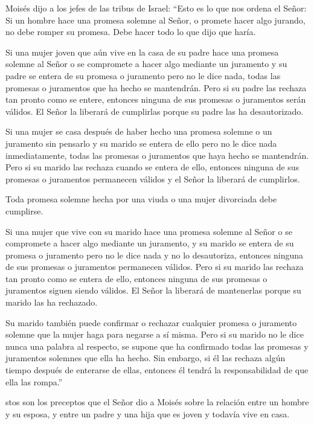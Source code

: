  Moisés dijo a los jefes de las tribus de Israel: ``Esto es
lo que nos ordena el Señor:  Si un hombre hace una promesa
solemne al Señor, o promete hacer algo jurando, no debe romper su
promesa. Debe hacer todo lo que dijo que haría.

 Si una mujer joven que aún vive en la casa de su padre hace
una promesa solemne al Señor o se compromete a hacer algo mediante un
juramento  y su padre se entera de su promesa o juramento
pero no le dice nada, todas las promesas o juramentos que ha hecho se
mantendrán.  Pero si su padre las rechaza tan pronto como se
entere, entonces ninguna de sus promesas o juramentos serán válidos. El
Señor la liberará de cumplirlas porque su padre las ha desautorizado.

 Si una mujer se casa después de haber hecho una promesa
solemne o un juramento sin pensarlo  y su marido se entera
de ello pero no le dice nada inmediatamente, todas las promesas o
juramentos que haya hecho se mantendrán.  Pero si su marido
las rechaza cuando se entera de ello, entonces ninguna de sus promesas o
juramentos permanecen válidos y el Señor la liberará de cumplirlos.

 Toda promesa solemne hecha por una viuda o una mujer
divorciada debe cumplirse.

 Si una mujer que vive con su marido hace una promesa
solemne al Señor o se compromete a hacer algo mediante un juramento,
 y su marido se entera de su promesa o juramento pero no le
dice nada y no lo desautoriza, entonces ninguna de sus promesas o
juramentos permanecen válidos.  Pero si su marido las
rechaza tan pronto como se entera de ello, entonces ninguna de sus
promesas o juramentos siguen siendo válidos. El Señor la liberará de
mantenerlas porque su marido las ha rechazado.

 Su marido también puede confirmar o rechazar cualquier
promesa o juramento solemne que la mujer haga para negarse a sí misma.
 Pero si su marido no le dice nunca una palabra al
respecto, se supone que ha confirmado todas las promesas y juramentos
solemnes que ella ha hecho.  Sin embargo, si él las rechaza
algún tiempo después de enterarse de ellas, entonces él tendrá la
responsabilidad de que ella las rompa.''

 stos son los preceptos que el Señor dio a Moisés sobre la
relación entre un hombre y su esposa, y entre un padre y una hija que es
joven y todavía vive en casa.

